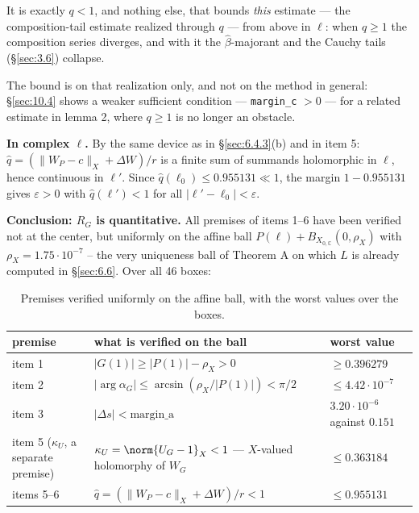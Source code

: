 \begin{enumerate}
   It is exactly $q<1$, and nothing else, that bounds \emph{this} estimate --- the composition-tail estimate realized through $q$ --- from above in $\ell$: when $q\ge1$ the composition series diverges, and with it the $\hat\beta$-majorant and the Cauchy tails (\S\ref{sec:3.6}) collapse.

   The bound is on that realization only, and not on the method in general: \S\ref{sec:10.4} shows a weaker sufficient condition --- \texttt{margin\_c} $> 0$ --- for a related estimate in lemma 2, where $q\ge1$ is no longer an obstacle.

   \textbf{In complex \boldmath$\ell$.} By the same device as in \S\ref{sec:6.4.3}(b) and in item 5: $\hat q=(\|W_P-c\|_X+\Delta W)/r$ is a finite sum of summands holomorphic in $\ell$, hence continuous in $\ell'$. Since $\hat q(\ell_0)\le 0.955131\ll1$, the margin $1-0.955131$ gives $\varepsilon>0$ with $\hat q(\ell')<1$ for all $|\ell'-\ell_0|<\varepsilon$.
\end{enumerate}

\textbf{Conclusion: \boldmath$R_G$ is quantitative.} All premises of items 1--6 have been verified not at the center, but uniformly on the affine ball $P(\ell)+B_{X_{0,\mathbb C}}(0,\rho_X)$ with $\rho_X=1.75\cdot10^{-7}$ -- the very uniqueness ball of Theorem A on which $L$ is already computed in \S\ref{sec:6.6}. Over all 46 boxes:

\begin{table}[ht]
\centering
\small
\caption{Premises verified uniformly on the affine ball, with the worst values over the boxes.}
\label{tab:ball-premises}
\begin{tabular}{lll}
\toprule
premise & what is verified on the ball & worst value \\
\midrule
item 1 & $|G(1)|\ge |P(1)|-\rho_X>0$ & $\ge0.396279$ \\
item 2 & $|\arg\alpha_G|\le\arcsin(\rho_X/|P(1)|)<\pi/2$ & $\le4.42\cdot10^{-7}$ \\
item 3 & $|\Delta s|<\mathrm{margin\_a}$ & $3.20\cdot10^{-6}$ against $0.151$ \\
item 5 ($\kappa_U$, a separate premise) & $\kappa_U=\norm{U_G-1}_X<1$ --- $X$-valued holomorphy of $W_G$ & $\le0.363184$ \\
items 5--6 & $\hat q=(\|W_P-c\|_X+\Delta W)/r<1$ & $\le0.955131$ \\
\bottomrule
\end{tabular}
\end{table}

